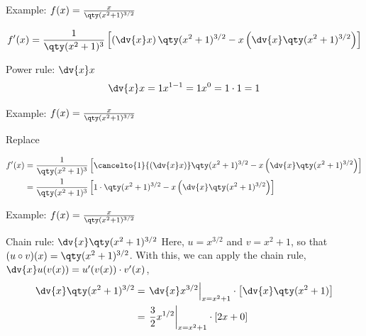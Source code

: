 \documentclass[../tufte-style.tex]{standalone}
\begin{document}
\begin{frame}{Example: \( f(x) = \frac{x}{\qty(x^{2}+1)^{3/2}} \)}

    \begin{gather*}
        f'(x) = \frac{1}{\qty(x^{2}+1)^{3}}
        \left[ 
            \left(\dv{x}x\right)\qty(x^{2}+1)^{3/2}
            -
            x\left(\dv{x}\qty(x^{2}+1)^{3/2}\right)
        \right]
    \end{gather*}

    \begin{block}{Power rule: \(\dv{x}x\)}
        \begin{align*}
            \dv{x}x = 1x^{1-1} = 1x^{0} = 1\cdot 1 =1
        \end{align*}
    \end{block}

\end{frame}

\begin{frame}{Example: \( f(x) = \frac{x}{\qty(x^{2}+1)^{3/2}} \)}

    \begin{block}{Replace}

    \begin{align*}
        f'(x) &= \frac{1}{\qty(x^{2}+1)^{3}}
        \left[ 
            \cancelto{1}{\left(\dv{x}x\right)}\qty(x^{2}+1)^{3/2}
            -
            x\left(\dv{x}\qty(x^{2}+1)^{3/2}\right)
        \right] \\
                &=\frac{1}{\qty(x^{2}+1)^{3}}
        \left[ 
            1\cdot\qty(x^{2}+1)^{3/2}
            -
            x\left(\dv{x}\qty(x^{2}+1)^{3/2}\right)
        \right] 
    \end{align*}
    \end{block}

\end{frame}

\begin{frame}{Example: \( f(x) = \frac{x}{\qty(x^{2}+1)^{3/2}} \)}

    \begin{block}{Chain rule: \(\dv{x}\qty(x^{2}+1)^{3/2}\)}
        Here, \(u=x^{3/2}\) and \(v = x^2+1\), so that \((u\circ v)(x) = \qty(x^{2}+1)^{3/2}\).
        With this, we can apply the chain rule, \(\dv{x}u(v(x)) = u'(v(x))\cdot v'(x)\),
        \begin{align*}
            \dv{x}\qty(x^{2}+1)^{3/2} &= \left.\dv{x}x^{3/2}\right|_{x=x^2+1} \cdot \left[\dv{x}\qty(x^2+1)\right] \\
                                      &= \left. \frac{3}{2}x^{1/2}\right|_{x=x^2+1} \cdot \left[2x+0\right]
        \end{align*}
    \end{block}

\end{frame}
\end{document}
